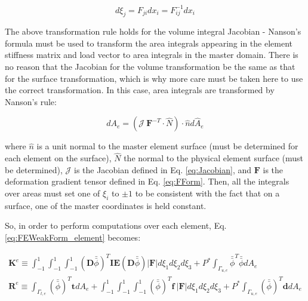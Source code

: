 \documentclass[10pt]{article}
\begin{document}
\begin{equation}
d\xi_j=F_{ji}dx_i=F_{ij}^{-1}dx_i
\end{equation}


The above transformation rule holds for the volume integral Jacobian - Nanson's formula must be used to transform the area integrals appearing in the element stiffness matrix and load vector to area integrals in the master domain. There is no reason that the Jacobian for the volume transformation be the same as that for the surface transformation, which is why more care must be taken here to use the correct transformation. In this case, area integrals are transformed by Nanson's rule:

\begin{equation}
dA_e=(\mathscr{J}\ \textbf{F}^{-T}\cdot\hat{N})\cdot\hat{n}d\hat{A}_e
\end{equation}

where \(\hat{n}\) is a unit normal to the master element surface (must be determined for each element on the surface), \(\hat{N}\) the normal to the physical element surface (must be determined), \(\mathscr{J}\) is the Jacobian defined in Eq. \eqref{eq:Jacobian}, and \(\textbf{F}\) is the deformation gradient tensor defined in Eq. \eqref{eq:FForm}. Then, all the integrals over areas must set one of \(\xi_i\) to \(\pm1\) to be consistent with the fact that on a surface, one of the master coordinates is held constant.








So, in order to perform computations over each element, Eq. \eqref{eq:FEWeakForm_element} becomes:

\begin{equation}
\label{eq:FEWeakForm_element}
\begin{aligned}
\textbf{K}^e\equiv\int_{-1}^{1}\int_{-1}^{1}\int_{-1}^{1}(\textbf{D}\bar{\bar{\phi}})^T\textbf{IE}(\textbf{D}\bar{\bar{\phi}})|\textbf{F}|d\xi_1d\xi_2d\xi_3 +P^{*}\int_{\Gamma_{u,e}}\bar{\bar{\phi}}^T\bar{\bar{\phi}}dA_e\\
\textbf{R}^e\equiv\int_{\Gamma_{t,e}}(\bar{\bar{\phi}})^T\textbf{t}dA_e+\int_{-1}^{1}\int_{-1}^{1}\int_{-1}^{1}(\bar{\bar{\phi}})^T\textbf{f}\ |\textbf{F}|d\xi_1d\xi_2d\xi_3+P^{*}\int_{\Gamma_{u,e}}(\bar{\bar{\phi}})^T\textbf{d}dA_e\\
\end{aligned}
\end{equation}
\end{document}
